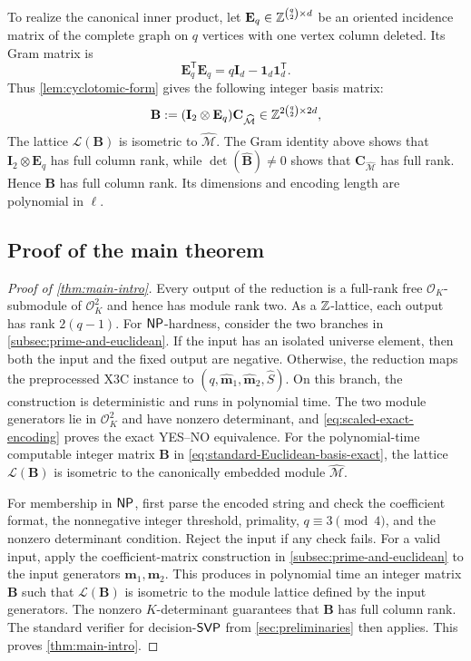 To realize the canonical inner product, let
$\mathbf E_q\in\mathbb Z^{\binom q2\times d}$ be an oriented incidence matrix of
the complete graph on $q$ vertices with one vertex column deleted.  Its Gram
matrix is
\[
 \mathbf E_q^{\mathsf T}\mathbf E_q
 =q\mathbf I_d-\mathbf1_d\mathbf1_d^{\mathsf T}.
\]
Thus \cref{lem:cyclotomic-form}
gives the following integer basis matrix:
\begin{equation}
\label{eq:standard-Euclidean-basis-exact}
 \mathbf B
 :=(\mathbf I_2\otimes\mathbf E_q)
\mathbf C_{\widehat{\mathcal M}}
  \in\mathbb Z^{2\binom q2\times2d},
\end{equation}
The lattice $\mathcal L(\mathbf B)$ is isometric to
$\widehat{\mathcal M}$.  The
Gram identity
above shows that $\mathbf I_2\otimes\mathbf E_q$ has full column rank, while
$\det(\widehat{\mathbf B})\ne0$ shows that
$\mathbf C_{\widehat{\mathcal M}}$ has full rank.  Hence $\mathbf B$ has full
column rank.  Its dimensions and encoding length are polynomial in $\ell$.

\subsection{Proof of the main theorem}

\begin{proof}[Proof of \cref{thm:main-intro}]
Every output of the reduction is a full-rank free $\mathcal{O}_K$-submodule of
$\mathcal{O}_K^2$ and hence has module rank two.  As a $\mathbb Z$-lattice,
each output has rank $2(q-1)$.
For $\mathsf{NP}$-hardness, consider the two branches in
\cref{subsec:prime-and-euclidean}.  If the input has an isolated universe
element, then both the input and the fixed output are negative.  Otherwise,
the reduction maps the preprocessed X3C instance to
$(q,\widehat{\mathbf m}_1,\widehat{\mathbf m}_2,\widehat S)$.  On this branch,
the construction is deterministic and runs in polynomial time.  The two
module generators lie in $\mathcal{O}_K^2$ and have nonzero determinant, and
\cref{eq:scaled-exact-encoding} proves the exact YES--NO equivalence.
For the polynomial-time computable integer matrix $\mathbf B$
in \cref{eq:standard-Euclidean-basis-exact}, the lattice
$\mathcal L(\mathbf B)$ is isometric to the canonically embedded module
$\widehat{\mathcal M}$.

For membership in $\mathsf{NP}$, first parse the encoded string and check the
coefficient format, the nonnegative integer threshold, primality,
$q\equiv3\pmod4$, and the nonzero determinant condition.  Reject the input if
 any check fails.  For a valid input, apply the coefficient-matrix construction
 in \cref{subsec:prime-and-euclidean} to the input generators
 $\mathbf m_1,\mathbf m_2$.  This produces in polynomial time an
 integer matrix $\mathbf B$ such that $\mathcal L(\mathbf B)$
 is isometric to the module lattice defined by the input generators.  The
 nonzero $K$-determinant
 guarantees that $\mathbf B$ has full column rank.  The standard verifier
 for decision-$\mathsf{SVP}$ from \cref{sec:preliminaries} then
 applies.  This proves
\cref{thm:main-intro}.
\end{proof}


